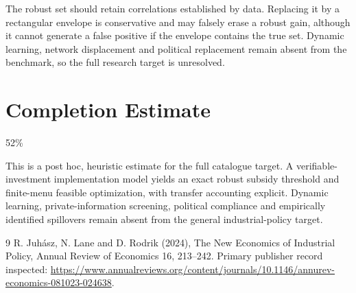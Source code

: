 \documentclass[11pt]{article}
\begin{document}
The robust set should retain correlations established by data. Replacing it by a rectangular envelope is conservative and may falsely erase a robust gain, although it cannot generate a false positive if the envelope contains the true set. Dynamic learning, network displacement and political replacement remain absent from the benchmark, so the full research target is unresolved.

\section{Completion Estimate}
52\%

This is a post hoc, heuristic estimate for the full catalogue target.
A verifiable-investment implementation model yields an exact robust subsidy threshold and finite-menu feasible optimization, with transfer accounting explicit. Dynamic learning, private-information screening, political compliance and empirically identified spillovers remain absent from the general industrial-policy target.

\begin{thebibliography}{9}
 R. Juh\'asz, N. Lane and D. Rodrik (2024), The New Economics of Industrial Policy, Annual Review of Economics 16, 213--242. Primary publisher record inspected:
\url{https://www.annualreviews.org/content/journals/10.1146/annurev-economics-081023-024638}.
\end{thebibliography}
\end{document}
